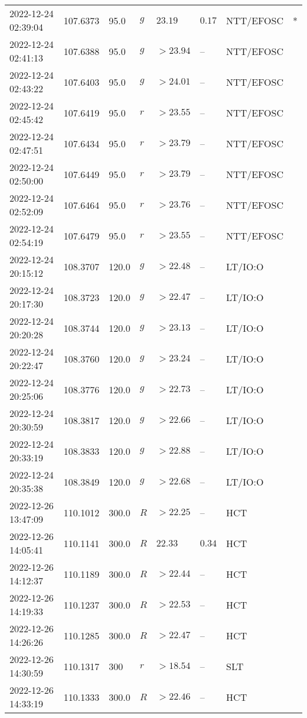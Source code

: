 \documentclass{nature_plusfigure}
\begin{document}
\begin{supplement}
\begin{center}
\begin{longtable}{llllllll}
2022-12-24 02:39:04 & 107.6373 & 95.0 & $g$ & $23.19$ & $0.17$ & NTT/EFOSC & * \\ 
2022-12-24 02:41:13 & 107.6388 & 95.0 & $g$ & $>23.94$ & -- & NTT/EFOSC &  \\ 
2022-12-24 02:43:22 & 107.6403 & 95.0 & $g$ & $>24.01$ & -- & NTT/EFOSC &  \\ 
2022-12-24 02:45:42 & 107.6419 & 95.0 & $r$ & $>23.55$ & -- & NTT/EFOSC &  \\ 
2022-12-24 02:47:51 & 107.6434 & 95.0 & $r$ & $>23.79$ & -- & NTT/EFOSC &  \\ 
2022-12-24 02:50:00 & 107.6449 & 95.0 & $r$ & $>23.79$ & -- & NTT/EFOSC &  \\ 
2022-12-24 02:52:09 & 107.6464 & 95.0 & $r$ & $>23.76$ & -- & NTT/EFOSC &  \\ 
2022-12-24 02:54:19 & 107.6479 & 95.0 & $r$ & $>23.55$ & -- & NTT/EFOSC &  \\ 
2022-12-24 20:15:12 & 108.3707 & 120.0 & $g$ & $>22.48$ & -- & LT/IO:O &  \\ 
2022-12-24 20:17:30 & 108.3723 & 120.0 & $g$ & $>22.47$ & -- & LT/IO:O &  \\ 
2022-12-24 20:20:28 & 108.3744 & 120.0 & $g$ & $>23.13$ & -- & LT/IO:O &  \\ 
2022-12-24 20:22:47 & 108.3760 & 120.0 & $g$ & $>23.24$ & -- & LT/IO:O &  \\ 
2022-12-24 20:25:06 & 108.3776 & 120.0 & $g$ & $>22.73$ & -- & LT/IO:O &  \\ 
2022-12-24 20:30:59 & 108.3817 & 120.0 & $g$ & $>22.66$ & -- & LT/IO:O &  \\ 
2022-12-24 20:33:19 & 108.3833 & 120.0 & $g$ & $>22.88$ & -- & LT/IO:O &  \\ 
2022-12-24 20:35:38 & 108.3849 & 120.0 & $g$ & $>22.68$ & -- & LT/IO:O &  \\ 
2022-12-26 13:47:09 & 110.1012 & 300.0 & $R$ & $>22.25$ & -- & HCT &  \\ 
2022-12-26 14:05:41 & 110.1141 & 300.0 & $R$ & $22.33$ & $0.34$ & HCT &  \\ 
2022-12-26 14:12:37 & 110.1189 & 300.0 & $R$ & $>22.44$ & -- & HCT &  \\ 
2022-12-26 14:19:33 & 110.1237 & 300.0 & $R$ & $>22.53$ & -- & HCT &  \\ 
2022-12-26 14:26:26 & 110.1285 & 300.0 & $R$ & $>22.47$ & -- & HCT &  \\ 
2022-12-26 14:30:59 & 110.1317 & 300 & $r$ & $>18.54$ & -- & SLT &  \\ 
2022-12-26 14:33:19 & 110.1333 & 300.0 & $R$ & $>22.46$ & -- & HCT &  \\ 

\end{longtable}
\end{center}
\end{supplement}
\end{document}
